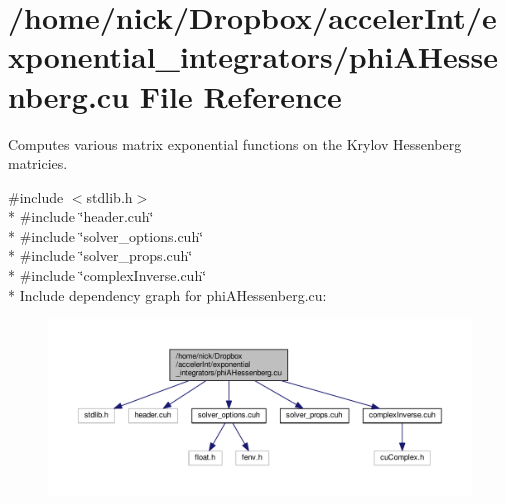 \hypertarget{phiAHessenberg_8cu}{}\section{/home/nick/\+Dropbox/acceler\+Int/exponential\+\_\+integrators/phi\+A\+Hessenberg.cu File Reference}
\label{phiAHessenberg_8cu}


Computes various matrix exponential functions on the Krylov Hessenberg matricies.  


{\ttfamily \#include $<$stdlib.\+h$>$}\\*
{\ttfamily \#include \char`\"{}header.\+cuh\char`\"{}}\\*
{\ttfamily \#include \char`\"{}solver\+\_\+options.\+cuh\char`\"{}}\\*
{\ttfamily \#include \char`\"{}solver\+\_\+props.\+cuh\char`\"{}}\\*
{\ttfamily \#include \char`\"{}complex\+Inverse.\+cuh\char`\"{}}\\*
Include dependency graph for phi\+A\+Hessenberg.\+cu\+:
\nopagebreak
\begin{figure}[H]
\begin{center}
\leavevmode
\includegraphics[width=350pt]{phiAHessenberg_8cu__incl}
\end{center}
\end{figure}
